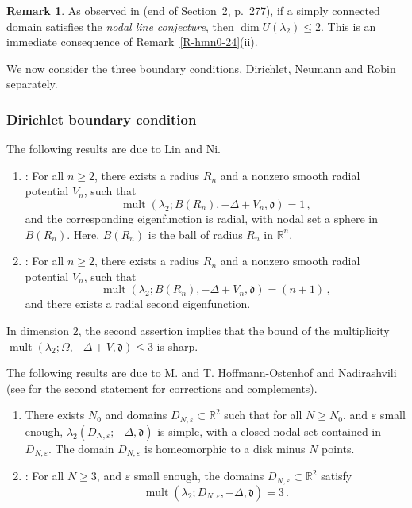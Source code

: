 \documentclass[12pt,a4paper]{amsart}
\theoremstyle{plain} %
\theoremstyle{definition}
\newtheorem{remark}[theorem]{Remark}
\numberwithin{equation}{section}
\numberwithin{figure}{section}
\numberwithin{table}{section}
\newcommand{\R}{\mathbb{R}}
\newcommand{\mf}{\mathfrak}
\DeclareMathOperator{\mult}{mult}
\begin{document}
{\begin{remark}\label{R-hmn0-26}
As observed in \cite{Liq1995} (end of Section~2, p.~277), if a simply connected domain satisfies the \emph{nodal line conjecture}, then $\dim U(\lambda_2) \le 2$. This is an immediate consequence  of Remark~\ref{R-hmn0-24}(ii).
\end{remark}

We now consider the three boundary conditions, Dirichlet, Neumann and Robin separately.

\subsubsection{Dirichlet boundary condition}\label{SSS-hmn-0CD}

The following results are due to Lin and Ni.
\begin{enumerate}[$\diamond$]
\item \cite[Theorem~3.6]{LiNi1988}: For all $n \ge 2$, there exists a radius $R_n$ and a nonzero smooth radial potential $V_n$, such that
\begin{equation*}
  \mult(\lambda_2; B(R_n), -\Delta + V_n,\mf{d}) = 1\,,
\end{equation*}
and the corresponding eigenfunction is radial, with nodal set a sphere in $B(R_n)$. Here, $B(R_n)$ is the ball of radius $R_n$ in $\R^n$.
\item \cite[Theorem~3.8]{LiNi1988}: For all $n \ge 2$, there exists a radius $R_n$ and a nonzero smooth radial potential $V_n$, such that
\begin{equation*}
  \mult(\lambda_2; B(R_n), -\Delta + V_n,\mf{d}) = (n+1)\,,
\end{equation*}
and there exists a radial second eigenfunction.
\end{enumerate}

In dimension $2$, the second assertion implies that the bound of the multiplicity $\mult(\lambda_2;\Omega,-\Delta+V,\mf{d}) \le 3$ is sharp.\medskip


The following results are due to M. and T. Hoffmann-Ostenhof and Nadirashvili \cite{HoHN1997, HoHN1998} (see  for the second statement   \cite{HeHJ2020} for corrections and complements).
\begin{enumerate}[$\diamond$]
\item \cite[Theorem~2.1]{HoHN1998} There exists $N_0$ and domains $D_{N,\varepsilon} \subset \R^2$ such that for all $N \ge N_0$, and $\varepsilon$ small enough, $\lambda_2(D_{N,\varepsilon};-\Delta,\mf{d})$ is simple, with a closed nodal set contained in $D_{N,\varepsilon}$. The domain $D_{N,\varepsilon}$ is homeomorphic to a disk minus $N$ points.
  \item \cite[Theorem~2.2]{HoHN1998}: For all $N \ge 3$, and $\varepsilon$ small enough, the domains $D_{N,\varepsilon} \subset \R^2$  satisfy
\begin{equation*}
  \mult(\lambda_2; D_{N,\varepsilon}, -\Delta,\mf{d}) = 3\,.
\end{equation*}
\end{enumerate}

}
\end{document}
